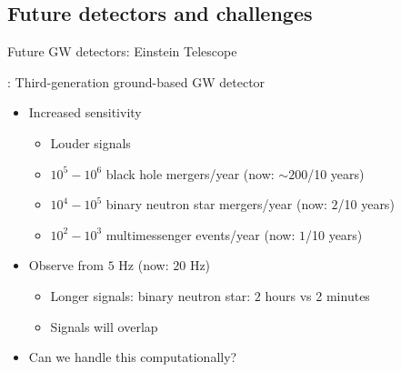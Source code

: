 \documentclass[usenames,dvipsnames,t]{beamer}
\begin{document}
    

\subsection{Future detectors and challenges}

\begin{frame}{Future GW detectors: Einstein Telescope}
  \def\x{3mm}
  \def\y{2mm}
  \def\z{1mm}

  : Third-generation ground-based GW detector~\cite{ET:2019dnz, Abac:2025saz}
  \begin{itemize}
    \item<2-> Increased sensitivity
    
    \begin{itemize}
      \item Louder signals
      
      \vspace{\z}

      \item $10^{5} - 10^{6}$ black hole mergers/year (now: $\sim 200$/10 years)
      
      \vspace{\z}
      
      \item $10^{4} - 10^{5}$ binary neutron star mergers/year (now: $2$/10 years)

      \vspace{\z}
      
      \item $10^{2} - 10^{3}$ multimessenger events/year (now: $1$/10 years)
    \end{itemize}

    \vspace{\y}

    \item<3-> Observe from $5$ Hz (now: $20$ Hz)
    \begin{itemize}
      \item Longer signals: binary neutron star: $2$ hours vs 2 minutes 
      \item Signals will overlap
    \end{itemize}

    \vspace{\y}

    \item<4-> Can we handle this computationally?
  \end{itemize}
\end{frame}
\end{document}
